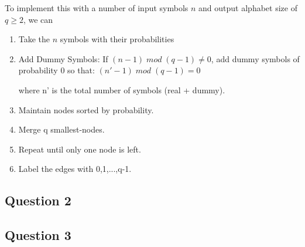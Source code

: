 \documentclass[]{template}
\begin{document}
        \noindent
        To implement this with a number of input symbols $n$ and output alphabet size of $q \geq 2$, we can
        
        \begin{enumerate}
            \item Take the $n$ symbols with their probabilities
            \item Add Dummy Symbols: If $(n-1) \; mod \; (q-1) \neq  0$, add dummy symbols of probability 0 so that:
            $(n' - 1) \; mod \; (q-1)=0$
            
            where n' is the total number of symbols (real + dummy).
            \item Maintain nodes sorted by probability.  
            \item Merge q smallest-nodes.
            \item Repeat until only one node is left.
            \item Label the edges with 0,1,...,q-1.
        \end{enumerate}
        
    \subsection{Question 2}

    \subsection{Question 3}
\end{document}
